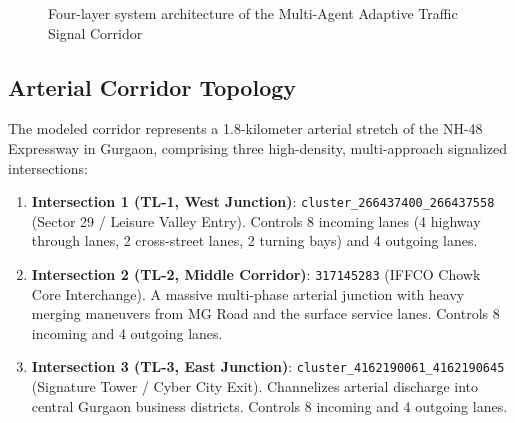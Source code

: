 \documentclass[12pt,a4paper,oneside]{report}
\begin{document}
\begin{figure}[htbp]
\caption{Four-layer system architecture of the Multi-Agent Adaptive Traffic Signal Corridor}
\label{fig:ch3_system_arch}
\end{figure}

\subsection{Arterial Corridor Topology}
The modeled corridor represents a 1.8-kilometer arterial stretch of the NH-48 Expressway in Gurgaon, comprising three high-density, multi-approach signalized intersections:
\begin{enumerate}
    \item \textbf{Intersection 1 (TL-1, West Junction)}: \texttt{cluster\_266437400\_266437558} (Sector 29 / Leisure Valley Entry). Controls 8 incoming lanes (4 highway through lanes, 2 cross-street lanes, 2 turning bays) and 4 outgoing lanes.
    \item \textbf{Intersection 2 (TL-2, Middle Corridor)}: \texttt{317145283} (IFFCO Chowk Core Interchange). A massive multi-phase arterial junction with heavy merging maneuvers from MG Road and the surface service lanes. Controls 8 incoming and 4 outgoing lanes.
    \item \textbf{Intersection 3 (TL-3, East Junction)}: \texttt{cluster\_4162190061\_4162190645} (Signature Tower / Cyber City Exit). Channelizes arterial discharge into central Gurgaon business districts. Controls 8 incoming and 4 outgoing lanes.
\end{enumerate}
\end{document}
